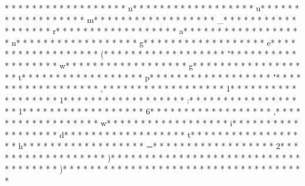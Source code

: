 * * *  * * *  * * *  *  * * *  *  * * *  * n* * *  * * *  * * *  *  * * *  *  * * *  * u* * *  * * *  * * *  *  * * *  *  * * *  * m* * *  * * *  * * *  *  * * *  *  * * *  * _* * *  * * *  * * *  *  * * *  *  * * *  * r* * *  * * *  * * *  *  * * *  *  * * *  * a* * *  * * *  * * *  *  * * *  *  * * *  * n* * *  * * *  * * *  *  * * *  *  * * *  * g* * *  * * *  * * *  *  * * *  *  * * *  * e* * *  * * *  * * *  *  * * *  *  * * *  * (* * *  * * *  * * *  *  * * *  *  * * *  * "* * *  * * *  * * *  *  * * *  *  * * *  * w* * *  * * *  * * *  *  * * *  *  * * *  * g* * *  * * *  * * *  *  * * *  *  * * *  * t* * *  * * *  * * *  *  * * *  *  * * *  * p* * *  * * *  * * *  *  * * *  *  * * *  * "* * *  * * *  * * *  *  * * *  *  * * *  * ,* * *  * * *  * * *  *  * * *  *  * * *  * 1* * *  * * *  * * *  *  * * *  *  * * *  * 1* * *  * * *  * * *  *  * * *  *  * * *  * :* * *  * * *  * * *  *  * * *  *  * * *  * 1* * *  * * *  * * *  *  * * *  *  * * *  * 6* * *  * * *  * * *  *  * * *  *  * * *  * ,* * *  * * *  * * *  *  * * *  *  * * *  * w* * *  * * *  * * *  *  * * *  *  * * *  * i* * *  * * *  * * *  *  * * *  *  * * *  * d* * *  * * *  * * *  *  * * *  *  * * *  * t* * *  * * *  * * *  *  * * *  *  * * *  * h* * *  * * *  * * *  *  * * *  *  * * *  * =* * *  * * *  * * *  *  * * *  *  * * *  * 2* * *  * * *  * * *  *  * * *  *  * * *  * )* * *  * * *  * * *  *  * * *  *  * * *  * 
* * *  * * *  * * *  *  * * *  *  * * *  * )* * *  * * *  * * *  *  * * *  *  * * *  * 
* * *  * * *  * * *  *  * * *  *  * * *  * 
